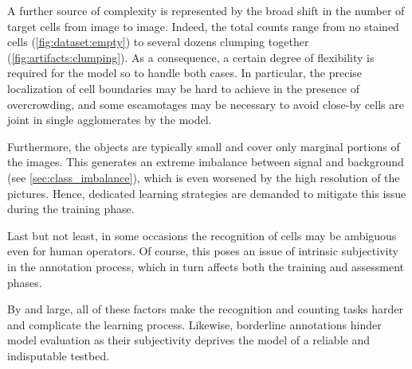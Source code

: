 A further source of complexity is represented by the broad shift in the number of target cells from image to image.
Indeed, the total counts range from no stained cells (\cref{fig:dataset:empty}) to several dozens clumping together (\cref{fig:artifacts:clumping}). 
As a consequence, a certain degree of flexibility is required for the model so to handle both cases.
In particular, the precise localization of cell boundaries may be hard to achieve in the presence of overcrowding, and some escamotages may be necessary to avoid close-by cells are joint in single agglomerates by the model.

Furthermore, the objects are typically small and cover only marginal portions of the images. This generates an extreme imbalance between signal and background (see \cref{sec:class_imbalance}), which is even worsened by the high resolution of the pictures.
Hence, dedicated learning strategies are demanded to mitigate this issue during the training phase.

Last but not least, in some occasions the recognition of cells may be ambiguous even for human operators. Of course, this poses an issue of intrinsic subjectivity in the annotation process,
which in turn affects both the training and assessment phases.

By and large, all of these factors make the recognition and counting tasks harder and complicate the learning process.
Likewise, borderline annotations hinder model evaluation as their subjectivity deprives the model of a reliable and indisputable testbed.